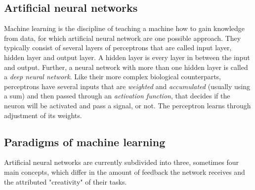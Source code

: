 \documentclass[12pt,a4]{article}
\begin{document}
\subsection{Artificial neural networks}
Machine learning is the discipline of teaching a machine how to gain knowledge from data, for which artificial neural network are one possible approach. They typically consist of several layers of perceptrons that are called input layer, hidden layer and output layer. A hidden layer is every layer in between the input and output. Further, a neural network with more than one hidden layer is called a \emph{deep neural network}. \citep{typesofML} \newline
Like their more complex biological counterparts, perceptrons have several inputs that are \emph{weighted} and \emph{accumulated} (usually using a sum) and then passed through an \emph{activation function}, that decides if the neuron will be activated and pass a signal, or not. The perceptron learns through adjustment of its weights.
\citep{pathmind}

\subsection{Paradigms of machine learning}
Artificial neural networks are currently subdivided into three, sometimes four main concepts, which differ in the amount of feedback the network receives and the attributed "creativity" of their tasks.
\end{document}
